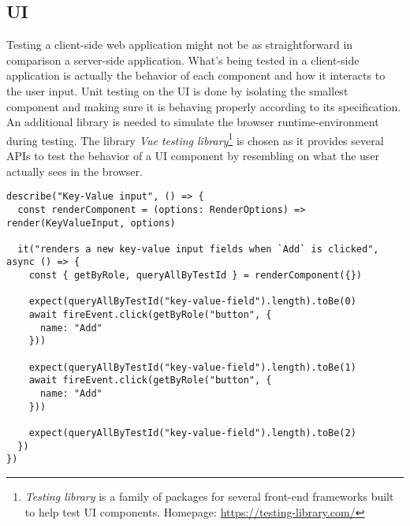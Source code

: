   \subsection{UI}

    Testing a client-side web application might not be as straightforward in comparison a server-side application. What's being tested in a client-side application is actually the behavior of each component and how it interacts to the user input. Unit testing on the UI is done by isolating the smallest component and making sure it is behaving properly according to its specification. An additional library is needed to simulate the browser runtime-environment during testing. The library \emph{Vue testing library}\footnote{\emph{Testing library} is a family of packages for several front-end frameworks built to help test UI components. Homepage: \url{https://testing-library.com/}} is chosen as it provides several APIs to test the behavior of a UI component by resembling on what the user actually sees in the browser. 

    \begin{lstlisting}[style=es6, caption={Example unit test of a UI component (TypeScript)}]
describe("Key-Value input", () => {
  const renderComponent = (options: RenderOptions) => render(KeyValueInput, options)

  it("renders a new key-value input fields when `Add` is clicked", async () => {
    const { getByRole, queryAllByTestId } = renderComponent({})

    expect(queryAllByTestId("key-value-field").length).toBe(0)
    await fireEvent.click(getByRole("button", {
      name: "Add" 
    }))

    expect(queryAllByTestId("key-value-field").length).toBe(1)
    await fireEvent.click(getByRole("button", {
      name: "Add" 
    }))

    expect(queryAllByTestId("key-value-field").length).toBe(2)
  })
})
    \end{lstlisting}